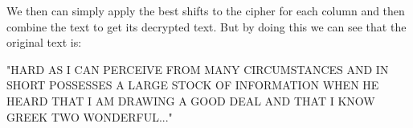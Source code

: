 \documentclass{article}
\begin{document}
We then can simply apply the best shifts to the cipher for each column and then combine the text to get its decrypted text. But by doing this we can see that the original text is:

"HARD AS I CAN PERCEIVE FROM MANY CIRCUMSTANCES AND IN SHORT POSSESSES A LARGE STOCK OF INFORMATION WHEN HE HEARD THAT I AM DRAWING A GOOD DEAL AND THAT I KNOW GREEK TWO WONDERFUL..."

\newpage
\printbibliography
\end{document}

